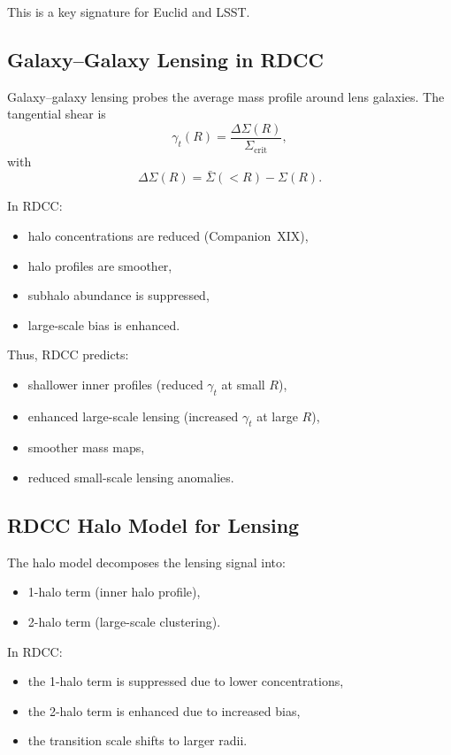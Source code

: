 \documentclass[11pt,a4paper]{article}
\begin{document}
This is a key signature for Euclid and LSST.

\subsection{Galaxy–Galaxy Lensing in RDCC}

Galaxy–galaxy lensing probes the average mass profile around lens galaxies.  
The tangential shear is
\begin{equation}
\gamma_{t}(R)
=
\frac{\Delta\Sigma(R)}{\Sigma_{\mathrm{crit}}},
\end{equation}
with
\begin{equation}
\Delta\Sigma(R)
=
\bar{\Sigma}(<R)
-
\Sigma(R).
\end{equation}

In RDCC:
\begin{itemize}
\item halo concentrations are reduced (Companion~XIX),
\item halo profiles are smoother,
\item subhalo abundance is suppressed,
\item large-scale bias is enhanced.
\end{itemize}

Thus, RDCC predicts:
\begin{itemize}
\item shallower inner profiles (reduced $\gamma_{t}$ at small $R$),
\item enhanced large-scale lensing (increased $\gamma_{t}$ at large $R$),
\item smoother mass maps,
\item reduced small-scale lensing anomalies.
\end{itemize}

\subsection{RDCC Halo Model for Lensing}

The halo model decomposes the lensing signal into:
\begin{itemize}
\item 1-halo term (inner halo profile),
\item 2-halo term (large-scale clustering).
\end{itemize}

In RDCC:
\begin{itemize}
\item the 1-halo term is suppressed due to lower concentrations,
\item the 2-halo term is enhanced due to increased bias,
\item the transition scale shifts to larger radii.
\end{itemize}
\end{document}
